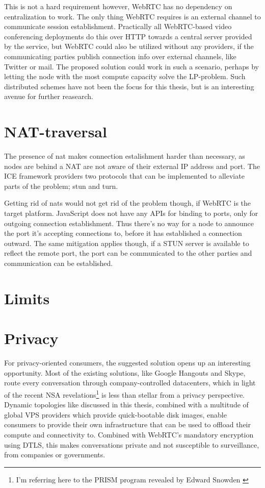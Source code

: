 This is not a hard requirement however, WebRTC has no dependency on centralization to work. The only thing WebRTC requires is an external channel to communicate session establishment. Practically all WebRTC-based video conferencing deployments do this over HTTP towards a central server provided by the service, but WebRTC could also be utilized without any providers, if the communicating parties publish connection info over external channels, like Twitter or mail. The proposed solution could work in such a scenario, perhaps by letting the node with the most compute capacity solve the LP-problem. Such distributed schemes have not been the focus for this thesis, but is an interesting avenue for further reasearch.


\section{NAT-traversal}

The presence of \gls{nat} makes connection estalishment harder than necessary, as nodes are behind a NAT are not aware of their external IP address and port. The \gls{ICE} framework providers two protocols that can be implemented to alleviate parts of the problem; \gls{stun} and \gls{turn}.

Getting rid of \glspl{nat} would not get rid of the problem though, if WebRTC is the target platform. JavaScript does not have any APIs for binding to ports, only for outgoing connection establishment. Thus there's no way for a node to announce the port it's accepting connections to, before it has established a connection outward. The same mitigation applies though, if a STUN server is available to reflect the remote port, the port can be communicated to the other parties and communication can be established.


\section{Limits}



\section{Privacy}

For privacy-oriented consumers, the suggested solution opens up an interesting opportunity. Most of the existing solutions, like Google Hangouts and Skype, route every conversation through company-controlled datacenters, which in light of the recent NSA revelations\footnote{I'm referring here to the PRISM program revealed by Edward Snowden \cite{prism}} is less than stellar from a privacy perspective. Dynamic topologies like discussed in this thesis, combined with a multitude of global VPS providers which provide quick-bootable disk images, enable consumers to provide their own infrastructure that can be used to offload their compute and connectivity to. Combined with WebRTC's mandatory encryption using DTLS, this makes conversations private and not susceptible to surveillance, from companies or governments.

